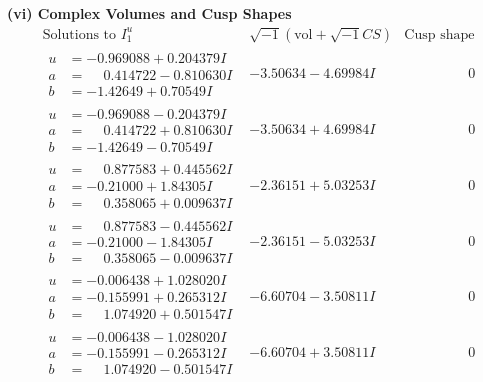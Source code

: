 \documentclass[1p]{elsarticle_modified}
\theoremstyle{definition}
\newcommand{\I}{\sqrt{-1}}
\begin{document}
\newpage\flushleft \textbf{(vi) Complex Volumes and Cusp Shapes}
$$\begin{array}{c|c|c}  
\text{Solutions to }I^u_{1}& \I (\text{vol} + \sqrt{-1}CS) & \text{Cusp shape}\\
 \hline 
\begin{aligned}
u &= -0.969088 + 0.204379 I \\
a &= \phantom{-}0.414722 - 0.810630 I \\
b &= -1.42649 + 0.70549 I\end{aligned}
 & -3.50634 - 4.69984 I & \phantom{-0.000000 } 0 \\ \hline\begin{aligned}
u &= -0.969088 - 0.204379 I \\
a &= \phantom{-}0.414722 + 0.810630 I \\
b &= -1.42649 - 0.70549 I\end{aligned}
 & -3.50634 + 4.69984 I & \phantom{-0.000000 } 0 \\ \hline\begin{aligned}
u &= \phantom{-}0.877583 + 0.445562 I \\
a &= -0.21000 + 1.84305 I \\
b &= \phantom{-}0.358065 + 0.009637 I\end{aligned}
 & -2.36151 + 5.03253 I & \phantom{-0.000000 } 0 \\ \hline\begin{aligned}
u &= \phantom{-}0.877583 - 0.445562 I \\
a &= -0.21000 - 1.84305 I \\
b &= \phantom{-}0.358065 - 0.009637 I\end{aligned}
 & -2.36151 - 5.03253 I & \phantom{-0.000000 } 0 \\ \hline\begin{aligned}
u &= -0.006438 + 1.028020 I \\
a &= -0.155991 + 0.265312 I \\
b &= \phantom{-}1.074920 + 0.501547 I\end{aligned}
 & -6.60704 - 3.50811 I & \phantom{-0.000000 } 0 \\ \hline\begin{aligned}
u &= -0.006438 - 1.028020 I \\
a &= -0.155991 - 0.265312 I \\
b &= \phantom{-}1.074920 - 0.501547 I\end{aligned}
 & -6.60704 + 3.50811 I & \phantom{-0.000000 } 0 \\ \hline\begin{aligned}

\end{aligned}
\end{array}$$
\end{document}
